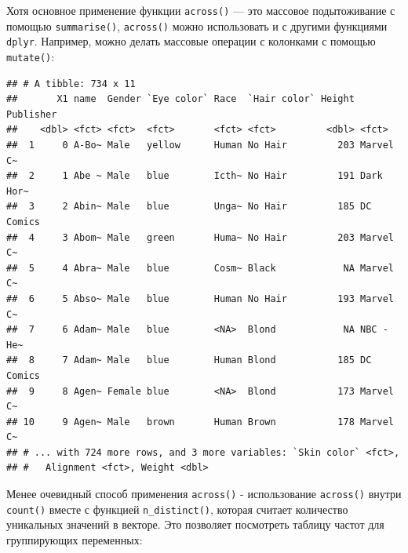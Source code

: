\documentclass[
]{book}
\newenvironment{Shaded}{\begin{snugshade}}{\end{snugshade}}
\newcommand{\ControlFlowTok}[1]{\textcolor[rgb]{0.13,0.29,0.53}{\textbf{#1}}}
\newcommand{\DecValTok}[1]{\textcolor[rgb]{0.00,0.00,0.81}{#1}}
\newcommand{\KeywordTok}[1]{\textcolor[rgb]{0.13,0.29,0.53}{\textbf{#1}}}
\newcommand{\NormalTok}[1]{#1}
\newcommand{\OperatorTok}[1]{\textcolor[rgb]{0.81,0.36,0.00}{\textbf{#1}}}
\newcommand{\StringTok}[1]{\textcolor[rgb]{0.31,0.60,0.02}{#1}}
\begin{document}
Хотя основное применение функции \texttt{across()} --- это массовое подытоживание с помощью \texttt{summarise()}, \texttt{across()} можно использовать и с другими функциями \texttt{dplyr}. Например, можно делать массовые операции с колонками с помощью \texttt{mutate()}:

\begin{Shaded}
\end{Shaded}

\begin{verbatim}
## # A tibble: 734 x 11
##       X1 name  Gender `Eye color` Race  `Hair color` Height Publisher
##    <dbl> <fct> <fct>  <fct>       <fct> <fct>         <dbl> <fct>    
##  1     0 A-Bo~ Male   yellow      Human No Hair         203 Marvel C~
##  2     1 Abe ~ Male   blue        Icth~ No Hair         191 Dark Hor~
##  3     2 Abin~ Male   blue        Unga~ No Hair         185 DC Comics
##  4     3 Abom~ Male   green       Huma~ No Hair         203 Marvel C~
##  5     4 Abra~ Male   blue        Cosm~ Black            NA Marvel C~
##  6     5 Abso~ Male   blue        Human No Hair         193 Marvel C~
##  7     6 Adam~ Male   blue        <NA>  Blond            NA NBC - He~
##  8     7 Adam~ Male   blue        Human Blond           185 DC Comics
##  9     8 Agen~ Female blue        <NA>  Blond           173 Marvel C~
## 10     9 Agen~ Male   brown       Human Brown           178 Marvel C~
## # ... with 724 more rows, and 3 more variables: `Skin color` <fct>,
## #   Alignment <fct>, Weight <dbl>
\end{verbatim}

Менее очевидный способ применения \texttt{across()} - использование \texttt{across()} внутри \texttt{count()} вместе с функцией \texttt{n\_distinct()}, которая считает количество уникальных значений в векторе. Это позволяет посмотреть таблицу частот для группирующих переменных:

\begin{Shaded}
\end{Shaded}
\end{document}
